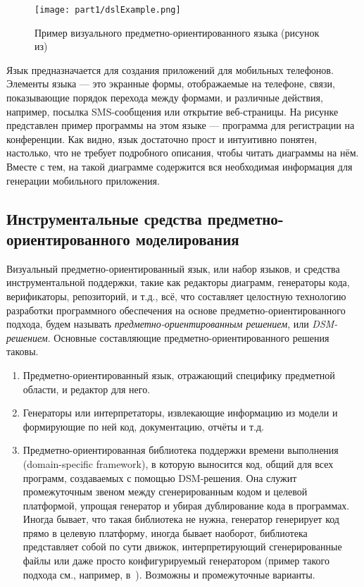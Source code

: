 \begin{figure} [ht]
	\begin{center}
		\texttt{[image: part1/dslExample.png]}
		\caption{Пример визуального предметно-ориентированного языка (рисунок из\cite{kelly2008domain})}
		\label{dslExample}
	\end{center}
\end{figure}

Язык предназначается для создания приложений для мобильных телефонов. 
Элементы языка --- это экранные формы, отображаемые на телефоне, связи, 
показывающие порядок перехода между формами, и различные действия, например, 
посылка SMS-сообщения или открытие веб-страницы. На рисунке представлен пример 
программы на этом языке --- программа для регистрации на конференции. 
Как видно, язык достаточно прост и интуитивно понятен, настолько, что не требует 
подробного описания, чтобы читать диаграммы на нём. Вместе с тем, на такой 
диаграмме содержится вся необходимая информация для генерации мобильного 
приложения.

\subsection{Инструментальные средства предметно-ориентированного моделирования}
Визуальный предметно-ориентированный язык, или набор языков, и средства 
инструментальной поддержки, такие как редакторы диаграмм, генераторы кода, 
верификаторы, репозиторий, и т.д., всё, что составляет целостную технологию 
разработки программного обеспечения на основе предметно-ориентированного 
подхода, будем называть \textit{предметно-ориентированным решением}, или \textit{DSM-решением}. 
Основные составляющие предметно-ориентированного решения таковы.

\begin{enumerate}
	\item Предметно-ориентированный язык, отражающий специфику предметной области, и редактор для него.
	\item Генераторы или интерпретаторы, извлекающие информацию из модели и формирующие по ней код, 
		документацию, отчёты и т.д.
	\item Предметно-ориентированная библиотека поддержки времени выполнения 
		(domain-specific framework), в которую выносится код, общий для всех 
		программ, создаваемых с помощью DSM-решения. Она служит промежуточным звеном 
		между сгенерированным кодом и целевой платформой, упрощая генератор и убирая 
		дублирование кода в программах. Иногда бывает, что такая библиотека не 
		нужна, генератор генерирует код прямо в целевую платформу, иногда бывает 
		наоборот, библиотека представляет собой по сути движок, интерпретирующий 
		сгенерированные файлы или даже просто конфигурируемый генератором (пример такого 
		подхода см., например, в~\cite{lyadova2010instruments}). Возможны и промежуточные варианты.
\end{enumerate}

